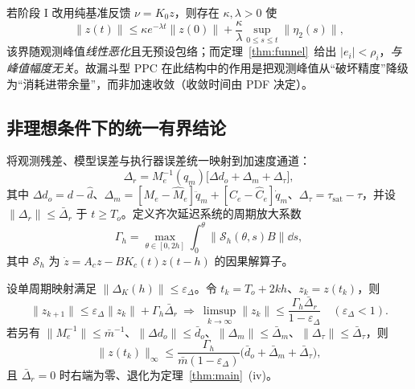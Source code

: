 \begin{corollary}[与纯 PD 阶段 I 的对照]\label{cor:pd_compare}
若阶段 I 改用纯基准反馈 \(\nu=K_0z\)，则存在 \(\kappa,\lambda>0\) 使
\begin{equation}
\lVert z(t)\rVert\le\kappa e^{-\lambda t}\lVert z(0)\rVert+\frac{\kappa}{\lambda}\sup_{0\le s\le t}\lVert\eta_2(s)\rVert ,
\label{eq:pd_bound}
\end{equation}
该界随观测峰值\emph{线性恶化}且无预设包络；而定理~\ref{thm:funnel}~给出 \(\lvert e_i\rvert<\rho_i\)，\emph{与峰值幅度无关}。故漏斗型 PPC 在此结构中的作用是把观测峰值从“破坏精度”降级为“消耗进带余量”，而非加速收敛（收敛时间由 PDF 决定）。
\end{corollary}

\subsection{非理想条件下的统一有界结论}
\label{sec:practical}

将观测残差、模型误差与执行器误差统一映射到加速度通道：
\begin{equation}
\Delta_r=M_e^{-1}(q_m)\bigl[\Delta d_o+\Delta_m+\Delta_\tau\bigr],
\label{eq:residual_lumped}
\end{equation}
其中 \(\Delta d_o=d-\hat d\)、\(\Delta_m=[M_e-\hat M_e]\ddot q_m+[C_e-\hat C_e]\dot q_m\)、\(\Delta_\tau=\tau_{\mathrm{sat}}-\tau\)，并设 \(\lVert\Delta_r\rVert\le\bar\Delta_r\) 于 \(t\ge T_o\)。定义齐次延迟系统的周期放大系数
\begin{equation}
\Gamma_h=\max_{\theta\in[0,2h]}\int_0^{\theta}\bigl\lVert\mathcal S_h(\theta,s)B\bigr\rVert\dd s,
\label{eq:Gamma_h}
\end{equation}
其中 \(\mathcal S_h\) 为 \(\dot z=A_cz-BK_c(t)z(t-h)\) 的因果解算子。

\begin{proposition}[非理想条件下的显式有界性]\label{prop:approx}
设单周期映射满足 \(\lVert\Delta_K(h)\rVert\le\varepsilon_\Delta\)。令 \(t_k=T_o+2kh\)、\(z_k=z(t_k)\)，则
\begin{equation}
\lVert z_{k+1}\rVert\le\varepsilon_\Delta\lVert z_k\rVert+\Gamma_h\bar\Delta_r
\ \Longrightarrow\
\limsup_{k\to\infty}\lVert z_k\rVert\le\frac{\Gamma_h\bar\Delta_r}{1-\varepsilon_\Delta}\quad(\varepsilon_\Delta<1).
\label{eq:approx_ultimate}
\end{equation}
若另有 \(\lVert M_e^{-1}\rVert\le\bar m^{-1}\)、\(\lVert\Delta d_o\rVert\le\bar d_o\)、\(\lVert\Delta_m\rVert\le\bar\Delta_m\)、\(\lVert\Delta_\tau\rVert\le\bar\Delta_\tau\)，则
\begin{equation}
\lVert z(t_k)\rVert_\infty\le\frac{\Gamma_h}{\bar m(1-\varepsilon_\Delta)}\bigl(\bar d_o+\bar\Delta_m+\bar\Delta_\tau\bigr),
\label{eq:explicit_bound}
\end{equation}
且 \(\bar\Delta_r=0\) 时右端为零、退化为定理~\ref{thm:main}~(iv)。
\end{proposition}

